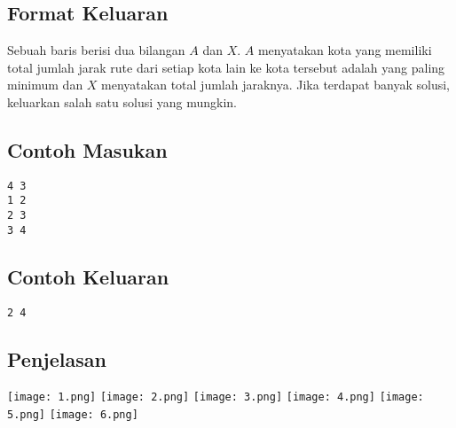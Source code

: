 \documentclass{article}
\begin{document}
\subsection*{Format Keluaran}
Sebuah baris berisi dua bilangan $A$ dan $X$. $A$ menyatakan kota yang memiliki total jumlah jarak rute dari setiap kota lain ke kota tersebut adalah yang paling minimum dan $X$ menyatakan total jumlah jaraknya. Jika terdapat banyak solusi, keluarkan salah satu solusi yang mungkin.
\\

\begin{multicols}{2}
\subsection*{Contoh Masukan}
\begin{lstlisting}
4 3
1 2
2 3
3 4
\end{lstlisting}
\columnbreak
\subsection*{Contoh Keluaran}
\begin{lstlisting}
2 4
\end{lstlisting}
\vfill
\null
\end{multicols}

\subsection*{Penjelasan}

\texttt{[image: 1.png]}
\texttt{[image: 2.png]}
\texttt{[image: 3.png]}
\texttt{[image: 4.png]}
\texttt{[image: 5.png]}
\texttt{[image: 6.png]}


\pagebreak
\end{document}
